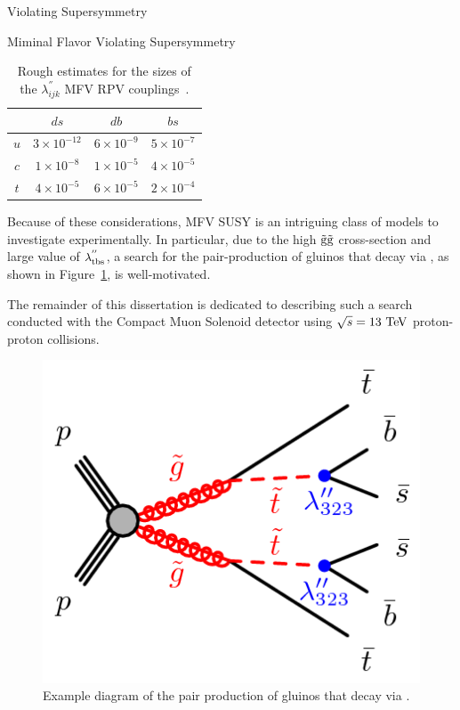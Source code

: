 \begin{section}{\RP Violating Supersymmetry}
\begin{subsection}{Miminal Flavor Violating Supersymmetry}
\begin{table}[tbp!]
\centering
\begin{tabular}{ |c|ccc| }
\hline
     &  $ds$                 &  $db$                &  $bs$               \\
\hline
$u$  &  $3 \times 10^{-12}$  &  $6 \times 10^{-9}$  &  $5 \times 10^{-7}$ \\
$c$  &  $1 \times 10^{-8}$   &  $1 \times 10^{-5}$  &  $4 \times 10^{-5}$ \\
$t$  &  $4 \times 10^{-5}$   &  $6 \times 10^{-5}$  &  $2 \times 10^{-4}$ \\
\hline
\end{tabular}
\caption{Rough estimates for the sizes of the $\lambda^{''}_{ijk}$ MFV RPV couplings~\cite{Csaki:2011ge}.}
\label{tab:mfv_couplings}
\end{table}

Because of these considerations, MFV SUSY is an intriguing class of models to investigate experimentally.
In particular, due to the high $\tilde{\mathrm{g}}\tilde{\mathrm{g}}$ cross-section and large value of $\lambda^{''}_{\mathrm{t}\mathrm{b}\mathrm{s}}$, a search for the pair-production of gluinos that decay via \rpvDecay, as shown in Figure~\ref{fig:rpv_decay}, is well-motivated.

The remainder of this dissertation is dedicated to describing such a search conducted with the Compact Muon Solenoid detector using $\sqrt{s} = 13~\mathrm{Te\kern -0.1em V}$ proton-proton collisions.

\begin{figure}[tbp!]
\begin{center}
\includegraphics[angle=0,width=0.40\columnwidth]{fig/rpv_decay.png}
\end{center}
\caption{Example diagram of the pair production of gluinos that decay via \rpvDecay.}
\label{fig:rpv_decay}
\end{figure}

\end{subsection}

\end{section}

